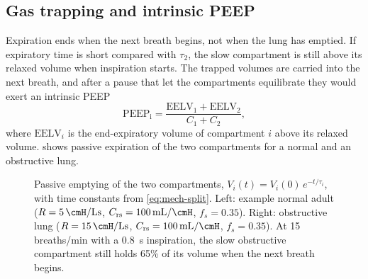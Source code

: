 \subsection{Gas trapping and intrinsic PEEP}
Expiration ends when the next breath begins, not when the lung has emptied. If expiratory time is short compared with $\tau_2$, the slow compartment is still above its relaxed volume when inspiration starts. The trapped volumes are carried into the next breath, and after a pause that let the compartments equilibrate they would exert an intrinsic PEEP~\citep{pepe1982}
\begin{equation}
\mathrm{PEEP_i} = \frac{\mathrm{EELV}_1 + \mathrm{EELV}_2}{C_1 + C_2},
\label{eq:mech-peepi}
\end{equation}
where $\mathrm{EELV}_i$ is the end-expiratory volume of compartment $i$ above its relaxed volume.  shows passive expiration of the two compartments for a normal and an obstructive lung.

\begin{figure}[ht]
\centering
{}
\caption{Passive emptying of the two compartments, $V_i(t) = V_i(0)\,e^{-t/\tau_i}$, with time constants from \cref{eq:mech-split}. Left: example normal adult ($R = \SI{5}{\cmH\per\liter\second}$, $\Crs = \SI{100}{\milli\liter\per\cmH}$, $f_s = 0.35$). Right: obstructive lung ($R = \SI{15}{\cmH\per\liter\second}$, $\Crs = \SI{100}{\milli\liter\per\cmH}$, $f_s = 0.35$). At 15 breaths/min with a \SI{0.8}{\second} inspiration, the slow obstructive compartment still holds 65\% of its volume when the next breath begins.}
\label{fig:mech-exp}
\end{figure}

